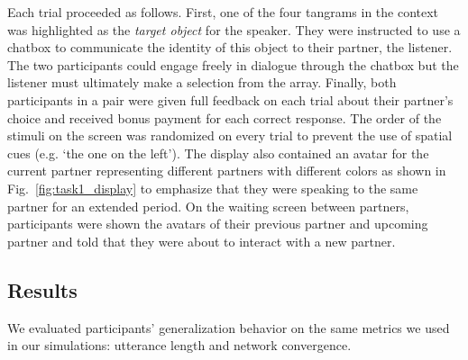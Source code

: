 Each trial proceeded as follows.
First, one of the four tangrams in the context was highlighted as the \emph{target object} for the speaker.
They were instructed to use a chatbox to communicate the identity of this object to their partner, the listener.
The two participants could engage freely in dialogue through the chatbox but the listener must ultimately make a selection from the array. 
Finally, both participants in a pair were given full feedback on each trial about their partner's choice and received bonus payment for each correct response. 
The order of the stimuli on the screen was randomized on every trial to prevent the use of spatial cues (e.g. `the one on the left').
The display also contained an avatar for the current partner  representing different partners with different colors as shown in Fig.~\ref{fig:task1_display} to emphasize that they were speaking to the same partner for an extended period.
On the waiting screen between partners, participants were shown the avatars of their previous partner and upcoming partner and told that they were about to interact with a new partner.

\subsection{Results}

We evaluated participants' generalization behavior on the same metrics we used in our simulations: utterance length and network convergence.

